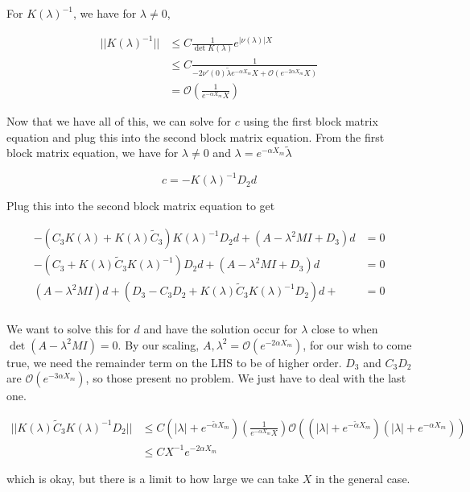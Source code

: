 \documentclass[12pt]{article}
\begin{document}
For $K(\lambda)^{-1}$, we have for $\lambda \neq 0$,

\begin{align*}
||K(\lambda)^{-1}|| &\leq C \frac{1}{\det K(\lambda)} e^{|\nu(\lambda)|X} \\
 &\leq C \frac{1}{-2 \nu'(0)\tilde{\lambda}e^{-\alpha X_m} X + \mathcal{O}(e^{-2 \alpha X_m} X )} \\
 &= \mathcal{O} \left( \frac{1}{e^{-\alpha X_m} X} \right)
\end{align*}

Now that we have all of this, we can solve for $c$ using the first block matrix equation and plug this into the second block matrix equation. From the first block matrix equation, we have for $\lambda \neq 0$ and $\lambda = e^{-\alpha X_m} \tilde{\lambda}$

\[
c = -K(\lambda)^{-1} D_2 d
\]

Plug this into the second block matrix equation to get

\begin{align*}
-(C_3 K(\lambda) + K(\lambda) \tilde{C}_3)K(\lambda)^{-1} D_2 d + (A - \lambda^2 MI + D_3)d &= 0 \\
-(C_3 + K(\lambda) \tilde{C}_3 K(\lambda)^{-1}) D_2 d + (A - \lambda^2 MI + D_3)d &= 0 \\ 
(A - \lambda^2 MI)d + (D_3 - C_3 D_2 + K(\lambda) \tilde{C}_3 K(\lambda)^{-1} D_2) d + &= 0 \\
\end{align*}

We want to solve this for $d$ and have the solution occur for $\lambda$ close to when $\det(A - \lambda^2 MI) = 0$. By our scaling, $A, \lambda^2 = \mathcal{O}(e^{-2 \alpha X_m})$, for our wish to come true, we need the remainder term on the LHS to be of higher order. $D_3$ and $C_3 D_2$ are $\mathcal{O}(e^{-3 \alpha X_m})$, so those present no problem. We just have to deal with the last one.

\begin{align*}
||K(\lambda) \tilde{C}_3 K(\lambda)^{-1} D_2|| &\leq
C (|\lambda| + e^{-\tilde{\alpha} X_m}) \left( \frac{1}{e^{-\alpha X_m} X} \right) \mathcal{O}((|\lambda| + e^{-\tilde{\alpha} X_m})(|\lambda| + e^{-\alpha X_m})) \\
&\leq C X^{-1} e^{-2 \alpha X_m}
\end{align*}

which is okay, but there is a limit to how large we can take $X$ in the general case.
\end{document}
